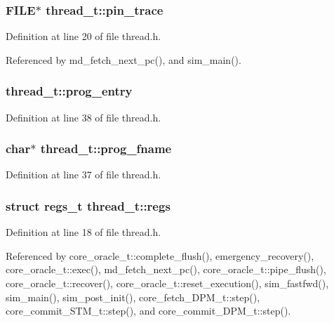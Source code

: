 \subsubsection[{pin\_\-trace}]{\setlength{\rightskip}{0pt plus 5cm}FILE$\ast$ {\bf thread\_\-t::pin\_\-trace}}\label{structthread__t_2b2709c2f5cc8eb7d9c87c8cc4e62b5d}




Definition at line 20 of file thread.h.

Referenced by md\_\-fetch\_\-next\_\-pc(), and sim\_\-main().
\subsubsection[{prog\_\-entry}]{ {\bf thread\_\-t::prog\_\-entry}}\label{structthread__t_90fa56619db7fcad03dc391e24d61ade}




Definition at line 38 of file thread.h.
\subsubsection[{prog\_\-fname}]{\setlength{\rightskip}{0pt plus 5cm}char$\ast$ {\bf thread\_\-t::prog\_\-fname}}\label{structthread__t_8221672d9c28579298ee6c4e6a571036}




Definition at line 37 of file thread.h.
\subsubsection[{regs}]{\setlength{\rightskip}{0pt plus 5cm}struct {\bf regs\_\-t} {\bf thread\_\-t::regs}\hspace{0.3cm}{\tt  [read]}}\label{structthread__t_91103da0506a0127e32ad580eef763f2}




Definition at line 18 of file thread.h.

Referenced by core\_\-oracle\_\-t::complete\_\-flush(), emergency\_\-recovery(), core\_\-oracle\_\-t::exec(), md\_\-fetch\_\-next\_\-pc(), core\_\-oracle\_\-t::pipe\_\-flush(), core\_\-oracle\_\-t::recover(), core\_\-oracle\_\-t::reset\_\-execution(), sim\_\-fastfwd(), sim\_\-main(), sim\_\-post\_\-init(), core\_\-fetch\_\-DPM\_\-t::step(), core\_\-commit\_\-STM\_\-t::step(), and core\_\-commit\_\-DPM\_\-t::step().
